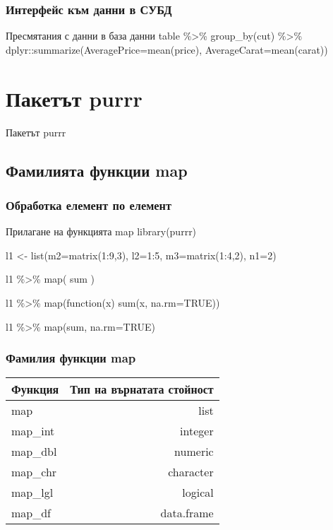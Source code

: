 \documentclass{beamer}
\begin{document}
\begin{frame}
\frametitle{Интерфейс към данни в СУБД}
\begin{block}{Пресмятания с данни в база данни}
table \%>\% group\_by(cut) \%>\% dplyr::summarize(AveragePrice=mean(price), AverageCarat=mean(carat))
\end{block}
\end{frame}

\section{Пакетът purrr}

\begin{frame}
\center \huge{Пакетът purrr}
\end{frame}

\subsection{Фамилията функции map}

\begin{frame}
\frametitle{Обработка елемент по елемент}
\begin{block}{Прилагане на функцията map}
library(purrr)

l1 <- list(m2=matrix(1:9,3), l2=1:5, m3=matrix(1:4,2), n1=2)

l1 \%>\% map( sum )

l1 \%>\% map(function(x) sum(x, na.rm=TRUE))

l1 \%>\% map(sum, na.rm=TRUE)
\end{block}
\end{frame}

\begin{frame}
\frametitle{Фамилия функции map}
\begin{table}[ht]
\centering
\begin{tabular}{|l|r|} 
  \hline
  Функция & Тип на върнатата стойност \\ [0.1ex] 
  \hline\hline
  map & list \\
  \hline
  map\_int & integer \\
  \hline
  map\_dbl & numeric \\
  \hline
  map\_chr & character \\
  \hline
  map\_lgl & logical \\
  \hline
  map\_df & data.frame \\
  \hline
\end{tabular}
\end{table}
\end{frame}
\end{document}

